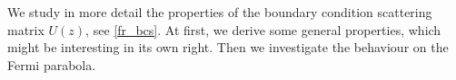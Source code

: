 We study in more detail the properties of the boundary condition scattering matrix $U(z)$, see \eqref{fr_bcs}.
At first, we derive some general properties, which might be interesting in its own right.
Then we investigate the behaviour on the Fermi parabola.
 
